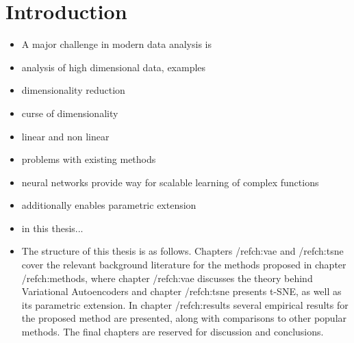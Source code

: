 \chapter{Introduction}
\label{ch:introduction}

\begin{itemize}
\item A major challenge in modern data analysis is 
\item analysis of high dimensional data, examples
\item dimensionality reduction
\item curse of dimensionality
\item linear and non linear
\item problems with existing methods
\item neural networks provide way for scalable learning of complex functions
\item additionally enables parametric extension
\item in this thesis...
\item The structure of this thesis is as follows. Chapters /ref{ch:vae} and /ref{ch:tsne} cover the relevant background literature for the methods proposed in chapter /ref{ch:methods}, where chapter /ref{ch:vae} discusses the theory behind Variational Autoencoders and chapter /ref{ch:tsne} presents t-SNE, as well as its parametric extension. In chapter /ref{ch:results} several empirical results for the proposed method are presented, along with comparisons to other popular methods. The final chapters are reserved for discussion and conclusions.
\end{itemize}

